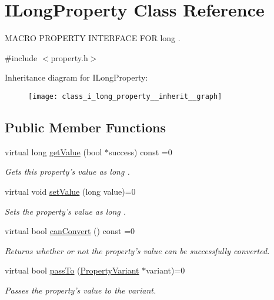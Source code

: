 \hypertarget{class_i_long_property}{\section{I\-Long\-Property Class Reference}
\label{class_i_long_property}
}


M\-A\-C\-R\-O P\-R\-O\-P\-E\-R\-T\-Y I\-N\-T\-E\-R\-F\-A\-C\-E F\-O\-R long .  




{\ttfamily \#include $<$property.\-h$>$}



Inheritance diagram for I\-Long\-Property\-:
\nopagebreak
\begin{figure}[H]
\begin{center}
\leavevmode
\texttt{[image: class\_i\_long\_property\_\_inherit\_\_graph]}
\end{center}
\end{figure}
\subsection*{Public Member Functions}
\begin{DoxyCompactItemize}
\item 
virtual long \hyperlink{class_i_long_property_a52a9796a321b4453f1162fe46746bbcd}{get\-Value} (bool $\ast$success) const =0
\begin{DoxyCompactList}\small\item\em Gets this property's value as long . \end{DoxyCompactList}\item 
virtual void \hyperlink{class_i_long_property_af9aeb97712cedf69e3d517a4680ed4c2}{set\-Value} (long value)=0
\begin{DoxyCompactList}\small\item\em Sets the property's value as long . \end{DoxyCompactList}\item 
virtual bool \hyperlink{class_i_long_property_ad6eb15873636142deab4423de11e1ef8}{can\-Convert} () const =0
\begin{DoxyCompactList}\small\item\em Returns whether or not the property's value can be successfully converted. \end{DoxyCompactList}\item 
virtual bool \hyperlink{class_i_long_property_a8484a6655a0b12268f8cb88bda1a357f}{pass\-To} (\hyperlink{class_property_variant}{Property\-Variant} $\ast$variant)=0
\begin{DoxyCompactList}\small\item\em Passes the property's value to the variant. \end{DoxyCompactList}\end{DoxyCompactItemize}


